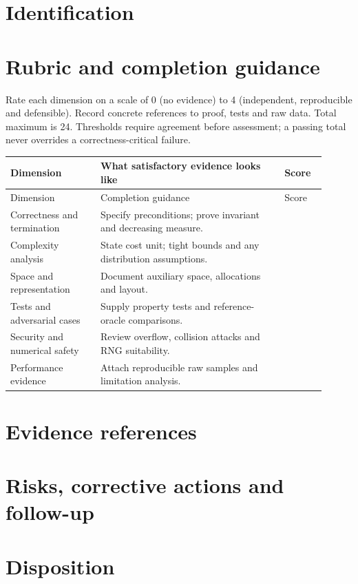 \documentclass[11pt,letterpaper]{article}
\begin{document}
\tableofcontents
\clearpage
{}
\section{Identification}
\section{Rubric and completion guidance}
Rate each dimension on a scale of 0 (no evidence) to 4 (independent, reproducible and defensible). Record concrete references to proof, tests and raw data. Total maximum is 24. Thresholds require agreement before assessment; a passing total never overrides a correctness-critical failure.
\small
\begin{longtable}{@{}p{0.26\linewidth}p{0.53\linewidth}p{0.12\linewidth}@{}}\toprule Dimension & What satisfactory evidence looks like & Score\\\midrule\endfirsthead\toprule Dimension & Completion guidance & Score\\\midrule\endhead
Correctness and termination & Specify preconditions; prove invariant and decreasing measure. & \\[1.0em]
Complexity analysis & State cost unit; tight bounds and any distribution assumptions. & \\[1.0em]
Space and representation & Document auxiliary space, allocations and layout. & \\[1.0em]
Tests and adversarial cases & Supply property tests and reference-oracle comparisons. & \\[1.0em]
Security and numerical safety & Review overflow, collision attacks and RNG suitability. & \\[1.0em]
Performance evidence & Attach reproducible raw samples and limitation analysis. & \\[1.0em]
\bottomrule\end{longtable}
\normalsize\section{Evidence references}
\section{Risks, corrective actions and follow-up}
\section{Disposition}
\end{document}
